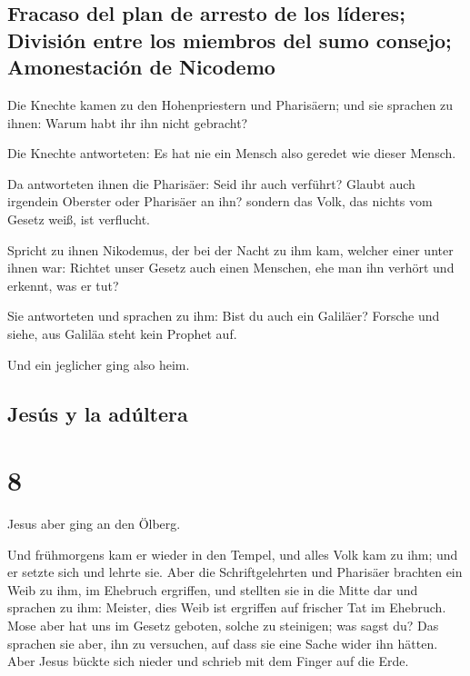 \hypertarget{fracaso-del-plan-de-arresto-de-los-luxedderes-divisiuxf3n-entre-los-miembros-del-sumo-consejo-amonestaciuxf3n-de-nicodemo}{%
\subsection{Fracaso del plan de arresto de los líderes; División entre
los miembros del sumo consejo; Amonestación de
Nicodemo}\label{fracaso-del-plan-de-arresto-de-los-luxedderes-divisiuxf3n-entre-los-miembros-del-sumo-consejo-amonestaciuxf3n-de-nicodemo}}

 Die Knechte kamen zu den Hohenpriestern und Pharisäern;
und sie sprachen zu ihnen: Warum habt ihr ihn nicht gebracht?

 Die Knechte antworteten: Es hat nie ein Mensch also
geredet wie dieser Mensch.

 Da antworteten ihnen die Pharisäer: Seid ihr auch
verführt?  Glaubt auch irgendein Oberster oder Pharisäer
an ihn?  sondern das Volk, das nichts vom Gesetz weiß,
ist verflucht.

 Spricht zu ihnen Nikodemus, der bei der Nacht zu ihm
kam, welcher einer unter ihnen war:  Richtet unser Gesetz
auch einen Menschen, ehe man ihn verhört und erkennt, was er tut?

 Sie antworteten und sprachen zu ihm: Bist du auch ein
Galiläer? Forsche und siehe, aus Galiläa steht kein Prophet auf.

 Und ein jeglicher ging also heim.

\hypertarget{jesuxfas-y-la-aduxfaltera}{%
\subsection{Jesús y la adúltera}\label{jesuxfas-y-la-aduxfaltera}}

\hypertarget{section-7}{%
\section{8}\label{section-7}}

 Jesus aber ging an den Ölberg.

 Und frühmorgens kam er wieder in den Tempel, und alles
Volk kam zu ihm; und er setzte sich und lehrte sie.  Aber
die Schriftgelehrten und Pharisäer brachten ein Weib zu ihm, im Ehebruch
ergriffen, und stellten sie in die Mitte dar  und sprachen
zu ihm: Meister, dies Weib ist ergriffen auf frischer Tat im Ehebruch.
 Mose aber hat uns im Gesetz geboten, solche zu steinigen;
was sagst du?  Das sprachen sie aber, ihn zu versuchen,
auf dass sie eine Sache wider ihn hätten. Aber Jesus bückte sich nieder
und schrieb mit dem Finger auf die Erde.


